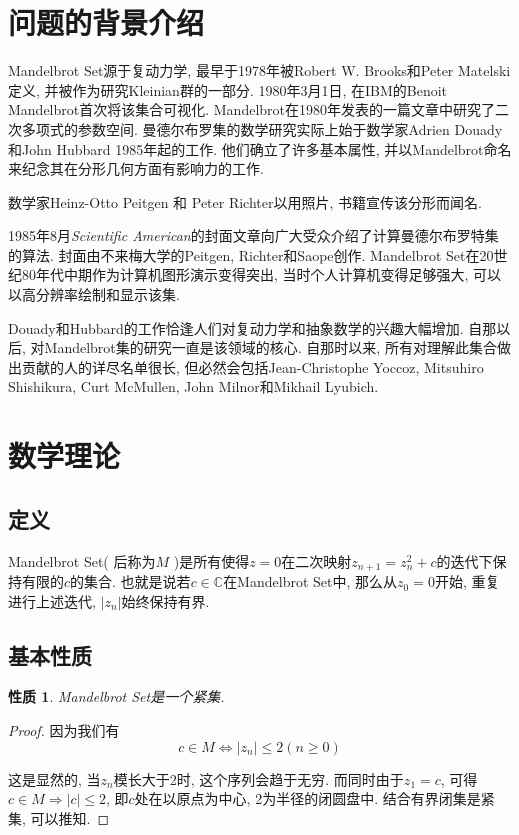\documentclass{ctexart}
\newtheorem{property}{性质}
\begin{document}
\section{问题的背景介绍}
Mandelbrot Set源于复动力学, 最早于1978年被Robert W. Brooks和Peter Matelski定义, 并被作为研究Kleinian群的一部分. 1980年3月1日, 在IBM的Benoit Mandelbrot首次将该集合可视化.
Mandelbrot在1980年发表的一篇文章中研究了二次多项式的参数空间. 曼德尔布罗集的数学研究实际上始于数学家Adrien Douady和John Hubbard 1985年起的工作. 他们确立了许多基本属性, 并以Mandelbrot命名来纪念其在分形几何方面有影响力的工作.

数学家Heinz-Otto Peitgen 和 Peter Richter以用照片, 书籍宣传该分形而闻名.

1985年8月\textit{Scientific American}的封面文章向广大受众介绍了计算曼德尔布罗特集的算法. 封面由不来梅大学的Peitgen, Richter和Saope创作. Mandelbrot Set在20世纪80年代中期作为计算机图形演示变得突出, 当时个人计算机变得足够强大, 可以以高分辨率绘制和显示该集.

Douady和Hubbard的工作恰逢人们对复动力学和抽象数学的兴趣大幅增加. 自那以后, 对Mandelbrot集的研究一直是该领域的核心. 自那时以来, 所有对理解此集合做出贡献的人的详尽名单很长, 但必然会包括Jean-Christophe Yoccoz, Mitsuhiro Shishikura, Curt McMullen, John Milnor和Mikhail Lyubich.

\section{数学理论}

\subsection{定义}
Mandelbrot Set( 后称为$M$ )是所有使得$z=0$在二次映射$z_{n+1}=z_n^2+c$的迭代下保持有限的$c$的集合. 也就是说若$c \in \mathbb{C}$在Mandelbrot Set中, 那么从$z_0=0$开始, 重复进行上述迭代, $|z_n|$始终保持有界.

\subsection{基本性质}

\begin{property}
Mandelbrot Set是一个紧集. 
\label{prop:compact}
\end{property}
\begin{proof}
因为我们有$$c \in M \iff |z_n| \le 2 (n \ge 0)$$
\par 这是显然的, 当$z_n$模长大于2时, 这个序列会趋于无穷. 而同时由于$z_1=c$, 可得$c \in M \Rightarrow |c| \le 2$, 即$c$处在以原点为中心, 2为半径的闭圆盘中. 结合有界闭集是紧集, 可以推知.
\end{proof}
\end{document}
